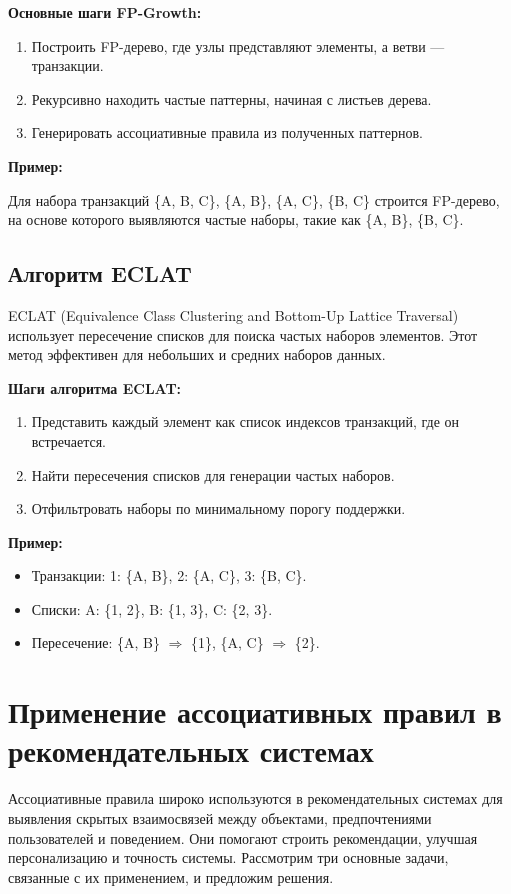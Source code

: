 \textbf{Основные шаги FP-Growth:}
\begin{enumerate}
    \item Построить FP-дерево, где узлы представляют элементы, а ветви — транзакции.
    \item Рекурсивно находить частые паттерны, начиная с листьев дерева.
    \item Генерировать ассоциативные правила из полученных паттернов.
\end{enumerate}

\textbf{Пример:}

Для набора транзакций \{A, B, C\}, \{A, B\}, \{A, C\}, \{B, C\} строится FP-дерево, на основе которого выявляются частые наборы, такие как \{A, B\}, \{B, C\}.

\subsection{Алгоритм ECLAT}

ECLAT (Equivalence Class Clustering and Bottom-Up Lattice Traversal) использует пересечение списков для поиска частых наборов элементов. Этот метод эффективен для небольших и средних наборов данных.

\textbf{Шаги алгоритма ECLAT:}
\begin{enumerate}
    \item Представить каждый элемент как список индексов транзакций, где он встречается.
    \item Найти пересечения списков для генерации частых наборов.
    \item Отфильтровать наборы по минимальному порогу поддержки.
\end{enumerate}

\textbf{Пример:}

\begin{itemize}
    \item Транзакции: 1: \{A, B\}, 2: \{A, C\}, 3: \{B, C\}.
    \item Списки: A: \{1, 2\}, B: \{1, 3\}, C: \{2, 3\}.
    \item Пересечение: \{A, B\} $\Rightarrow$ \{1\}, \{A, C\} $\Rightarrow$ \{2\}.
\end{itemize}

\section{Применение ассоциативных правил в рекомендательных системах}

Ассоциативные правила широко используются в рекомендательных системах для выявления скрытых взаимосвязей между объектами, предпочтениями пользователей и поведением. Они помогают строить рекомендации, улучшая персонализацию и точность системы. Рассмотрим три основные задачи, связанные с их применением, и предложим решения.

